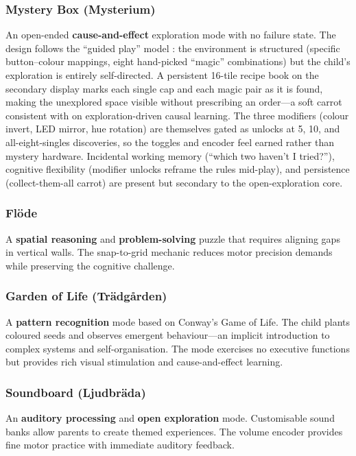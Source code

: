 \documentclass[12pt, a4paper]{article}
\begin{document}
\subsubsection{Mystery Box (Mysterium)}
An open-ended \textbf{cause-and-effect} exploration mode with no failure state.
The design follows the ``guided play'' model \citep{weisberg2013guided}: the
environment is structured (specific button--colour mappings, eight hand-picked
``magic'' combinations) but the child's exploration is entirely self-directed.
A persistent 16-tile recipe book on the secondary display marks each single
cap and each magic pair as it is found, making the unexplored space visible
without prescribing an order---a soft carrot consistent with
\citet{bonawitz2011double} on exploration-driven causal learning. The three
modifiers (colour invert, LED mirror, hue rotation) are themselves gated as
unlocks at 5, 10, and all-eight-singles discoveries, so the toggles and
encoder feel earned rather than mystery hardware. Incidental working memory
(``which two haven't I tried?''), cognitive flexibility (modifier unlocks
reframe the rules mid-play), and persistence (collect-them-all carrot) are
present but secondary to the open-exploration core.

\subsubsection{Fl\"ode}
A \textbf{spatial reasoning} and \textbf{problem-solving} puzzle that requires
aligning gaps in vertical walls. The snap-to-grid mechanic reduces motor
precision demands while preserving the cognitive challenge.

\subsubsection{Garden of Life (Tr\"adg\aa rden)}
A \textbf{pattern recognition} mode based on Conway's Game of Life. The child
plants coloured seeds and observes emergent behaviour---an implicit introduction
to complex systems and self-organisation. The mode exercises no executive
functions but provides rich visual stimulation and cause-and-effect learning.

\subsubsection{Soundboard (Ljudbr\"ada)}
An \textbf{auditory processing} and \textbf{open exploration} mode.
Customisable sound banks allow parents to create themed experiences. The volume
encoder provides fine motor practice with immediate auditory feedback.
\end{document}
